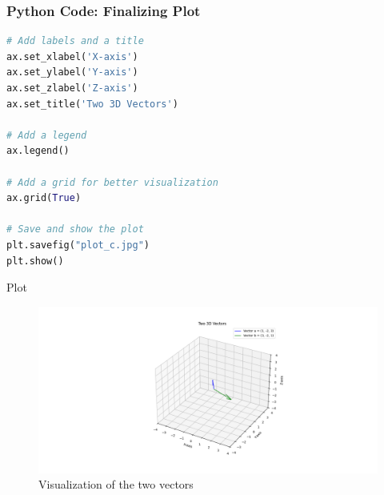 \documentclass{beamer}
\begin{document}
\begin{frame}[fragile]
    \frametitle{Python Code: Finalizing Plot}
    \begin{lstlisting}[language=Python]
# Add labels and a title
ax.set_xlabel('X-axis')
ax.set_ylabel('Y-axis')
ax.set_zlabel('Z-axis')
ax.set_title('Two 3D Vectors')

# Add a legend
ax.legend()

# Add a grid for better visualization
ax.grid(True)

# Save and show the plot
plt.savefig("plot_c.jpg")
plt.show()
    \end{lstlisting}
\end{frame}

\begin{frame}{Plot}
    \begin{figure}
        \centering
        \includegraphics[width=0.9\columnwidth]{../figs/pure_python.png}
        \caption{Visualization of the two vectors}
        \label{fig:final_plot}
    \end{figure}
\end{frame}
\end{document}
